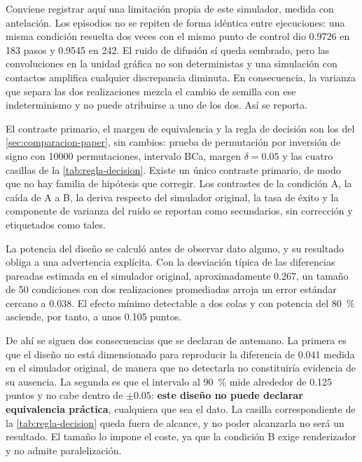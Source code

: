 Conviene registrar aqu\'i una limitaci\'on propia de este simulador, medida con antelaci\'on.
Los episodios no se repiten de forma id\'entica entre ejecuciones: una misma condici\'on
resuelta dos veces con el mismo punto de control dio \num{0.9726} en \num{183} pasos y
\num{0.9545} en \num{242}. El ruido de difusi\'on s\'i queda sembrado, pero las convoluciones
en la unidad gr\'afica no son deterministas y una simulaci\'on con contactos amplifica
cualquier discrepancia diminuta. En consecuencia, la varianza que separa las dos
realizaciones mezcla el cambio de semilla con ese indeterminismo y no puede atribuirse a uno
de los dos. As\'i se reporta.


El contraste primario, el margen de equivalencia y la regla de decisi\'on son los del
\cref{sec:comparacion-paper}, sin cambios: prueba de permutaci\'on por inversi\'on de signo
con \num{10000} permutaciones, intervalo BCa, margen $\delta = \num{0.05}$ y las cuatro
casillas de la \cref{tab:regla-decision}. Existe un \'unico contraste primario, de modo que
no hay familia de hip\'otesis que corregir. Los contrastes de la condici\'on A, la ca\'ida de
A a B, la deriva respecto del simulador original, la tasa de \'exito y la componente de
varianza del ruido se reportan como secundarios, sin correcci\'on y etiquetados como tales.

La potencia del dise\~no se calcul\'o antes de observar dato alguno, y su resultado obliga a
una advertencia expl\'icita. Con la desviaci\'on t\'ipica de las diferencias pareadas
estimada en el simulador original, aproximadamente \num{0.267}, un tama\~no de \num{50}
condiciones con dos realizaciones promediadas arroja un error est\'andar cercano a
\num{0.038}. El efecto m\'inimo detectable a dos colas y con potencia del \SI{80}{\percent}
asciende, por tanto, a unos \num{0.105} puntos.

De ah\'i se siguen dos consecuencias que se declaran de antemano. La primera es que el
dise\~no no est\'a dimensionado para reproducir la diferencia de \num{0.041} medida en el
simulador original, de manera que no detectarla no constituir\'ia evidencia de su ausencia.
La segunda es que el intervalo al \SI{90}{\percent} mide alrededor de \num{0.125} puntos y no
cabe dentro de $\pm\num{0.05}$: \textbf{este dise\~no no puede declarar equivalencia
pr\'actica}, cualquiera que sea el dato. La casilla correspondiente de la
\cref{tab:regla-decision} queda fuera de alcance, y no poder alcanzarla no ser\'a un
resultado. El tama\~no lo impone el coste, ya que la condici\'on B exige renderizador y no
admite paralelizaci\'on.

